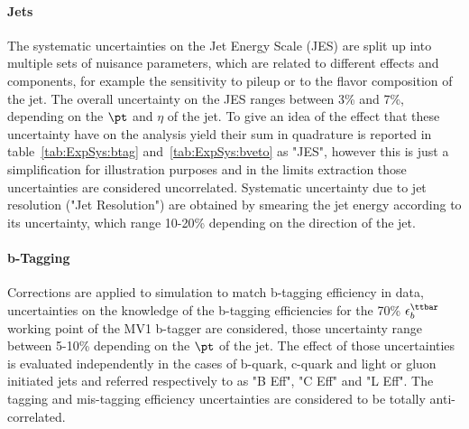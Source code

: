 \paragraph{Jets}
The systematic uncertainties on the Jet Energy Scale (JES) are split up into multiple sets of nuisance parameters, which
are related to different effects and components, for example the sensitivity to pileup or
to the flavor composition of the jet. The overall uncertainty on the JES ranges 
between 3\% and 7\%, depending on the $\pt$ and $\eta$ of the jet. To give an idea of the effect that these
uncertainty have on the analysis yield their sum in quadrature is reported in table~\ref{tab:ExpSys:btag} and~\ref{tab:ExpSys:bveto} as "JES", however
this is just a simplification for illustration purposes and in the limits extraction those uncertainties are considered uncorrelated.
Systematic uncertainty due to jet resolution ("Jet Resolution") are obtained by smearing the jet energy 
according to its uncertainty, which range 10-20\% depending on the direction of the jet.

\paragraph{b-Tagging}  Corrections are applied to simulation
to match b-tagging efficiency in data, uncertainties on the knowledge 
of the b-tagging efficiencies for the 70\% $\epsilon_b^{\ttbar}$ working point of the MV1 b-tagger are
considered, those uncertainty range between 5-10\% depending on the $\pt$ of the jet. 
The effect of those uncertainties is evaluated independently in the cases of
 b-quark, c-quark and light or gluon initiated jets and referred respectively 
to as "B  Eff", "C Eff" and "L Eff". The tagging and mis-tagging efficiency uncertainties 
 are considered to be totally anti-correlated. 

